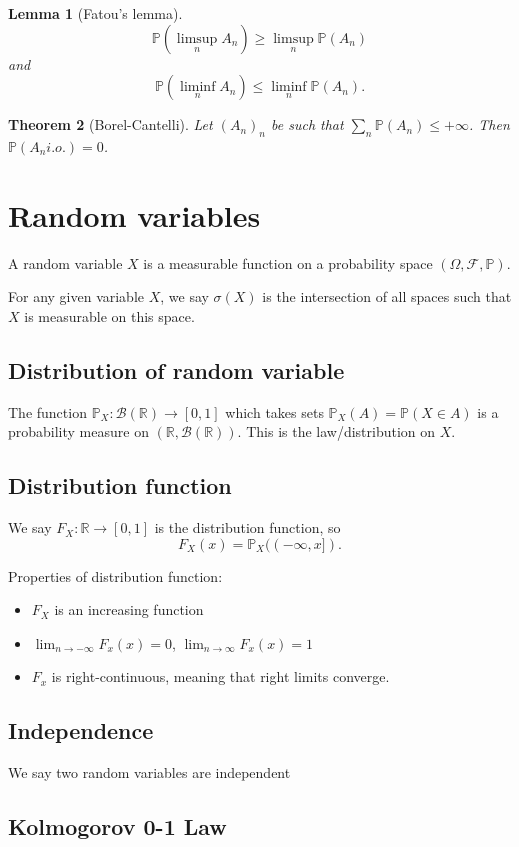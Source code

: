 \documentclass{article}
\newtheorem{theorem}{Theorem}
\newtheorem{lemma}[theorem]{Lemma}
\theoremstyle{definition}
\numberwithin{theorem}{section}
\numberwithin{equation}{section}
\begin{document}
\begin{lemma}[Fatou's lemma]
	\begin{equation}
		\mathbb{P}(\limsup_n A_n) \geq \limsup_n \mathbb{P}(A_n)
	\end{equation} and \begin{equation}
	\mathbb{P}(\liminf_n A_n) \leq \liminf_n \mathbb{P}(A_n).
	\end{equation}
\end{lemma}

\begin{theorem}[Borel-Cantelli]
	Let $(A_n)_n$ be such that $\sum_n \mathbb{P}(A_n) \leq +\infty$. Then $\mathbb{P}(A_n i.o.) = 0$. 
\end{theorem}


\section{Random variables}
A random variable $X$ is a measurable function on a probability space  $(\Omega, \mathcal{F}, \mathbb{P})$. 

For any given variable $X$, we say $\sigma(X)$ is the intersection of all spaces such that $X$ is measurable on this space. 

\subsection{Distribution of random variable}

The function $\mathbb{P}_X: \mathcal{B}(\mathbb{R}) \rightarrow [0,1]$ which takes sets $\mathbb{P}_X(A) = \mathbb{P}(X \in A)$ is a probability measure on $(\mathbb{R}, \mathcal{B}(\mathbb{R}))$. This is the law/distribution on $X$. 

\subsection{Distribution function}
We say $F_X : \mathbb{R} \rightarrow [0, 1]$ is the distribution function, so
\begin{equation}
	F_X(x) = \mathbb{P}_X((-\infty, x]).
\end{equation}

Properties of distribution function:
\begin{itemize}
	\item $F_X$ is an increasing function
	\item $\lim_{n \rightarrow -\infty} F_x(x) = 0$,  $\lim_{n \rightarrow \infty} F_x(x) = 1$
	\item $F_x$ is right-continuous, meaning that right limits converge. 
\end{itemize}

\subsection{Independence}
We say two random variables are independent 
 
\subsection{Kolmogorov 0-1 Law}
\end{document}
